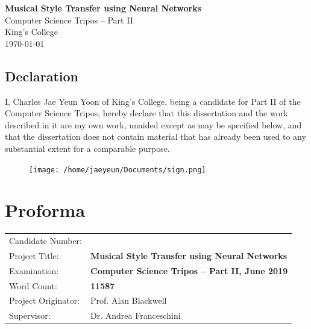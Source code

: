\documentclass[12pt,a4paper,]{report}
\date{}
\begin{document}
\pagestyle{empty}


\vspace*{60mm}
\begin{center}
\Huge
\textbf{Musical Style Transfer using Neural Networks} \\[5mm]
Computer Science Tripos -- Part II \\[5mm]
King's College \\[5mm]
\today  %
\end{center}

\newpage

\section*{Declaration}

I, Charles Jae Yeun Yoon of King's College, being a candidate for Part
II of the Computer Science Tripos, hereby declare that this dissertation
and the work described in it are my own work, unaided except as may be
specified below, and that the dissertation does not contain material
that has already been used to any substantial extent for a comparable
purpose.

\bigskip
{}

\begin{figure}
    \texttt{[image: /home/jaeyeun/Documents/sign.png]}
\end{figure}

\medskip
{}

\newpage

\chapter*{Proforma}

\begin{tabular}{ll}
Candidate Number:   & \bf                     \\
Project Title:      & \bf Musical Style Transfer using Neural Networks \\
Examination:        & \bf Computer Science Tripos -- Part II, June 2019 \\
Word Count:         & \bf 11587 \footnotemark[1] \\ 
Project Originator: & Prof. Alan Blackwell                      \\
Supervisor:         & Dr. Andrea Franceschini                    \\ 
\end{tabular}
\end{document}
